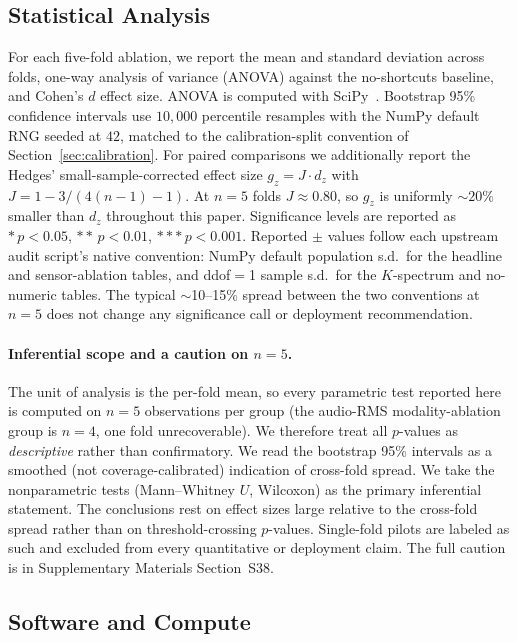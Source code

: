 \documentclass[sensors,article,submit,moreauthors,pdftex]{Definitions/mdpi}
\begin{document}
\subsection{Statistical Analysis}
\label{sec:stats}

For each five-fold ablation, we report the mean and standard deviation across folds, one-way analysis of variance (ANOVA) against the no-shortcuts baseline, and Cohen's $d$ effect size. ANOVA is computed with SciPy~\cite{virtanen2020scipy}. Bootstrap 95\% confidence intervals use $10{,}000$ percentile resamples with the NumPy default RNG seeded at $42$, matched to the calibration-split convention of Section~\ref{sec:calibration}. For paired comparisons we additionally report the Hedges' small-sample-corrected effect size $g_z\!=\!J\!\cdot\!d_z$ with $J\!=\!1\!-\!3/(4(n\!-\!1)\!-\!1)$. At $n\!=\!5$ folds $J\!\approx\!0.80$, so $g_z$ is uniformly $\sim$$20\%$ smaller than $d_z$ throughout this paper. Significance levels are reported as $\ast\,p<0.05$, $\ast\ast\,p<0.01$, $\ast\ast\ast\,p<0.001$. Reported $\pm$ values follow each upstream audit script's native convention: NumPy default population s.d.\ for the headline and sensor-ablation tables, and ddof$=$1 sample s.d.\ for the $K$-spectrum and no-numeric tables. The typical $\sim$10--15\% spread between the two conventions at $n\!=\!5$ does not change any significance call or deployment recommendation.

\paragraph{Inferential scope and a caution on $n=5$.} The unit of analysis is the per-fold mean, so every parametric test reported here is computed on $n=5$ observations per group (the audio-RMS modality-ablation group is $n=4$, one fold unrecoverable). We therefore treat all $p$-values as \emph{descriptive} rather than confirmatory. We read the bootstrap 95\% intervals as a smoothed (not coverage-calibrated) indication of cross-fold spread. We take the nonparametric tests (Mann--Whitney $U$, Wilcoxon) as the primary inferential statement. The conclusions rest on effect sizes large relative to the cross-fold spread rather than on threshold-crossing $p$-values. Single-fold pilots are labeled as such and excluded from every quantitative or deployment claim. The full caution is in Supplementary Materials Section~S38.

\subsection{Software and Compute}
\label{sec:software}
\end{document}
